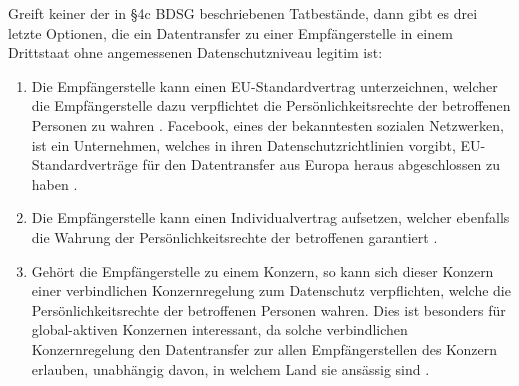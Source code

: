 \par
Greift keiner der in §4c BDSG beschriebenen Tatbestände, dann gibt es drei letzte Optionen, die ein Datentransfer zu einer Empfängerstelle in einem Drittstaat ohne angemessenen Datenschutzniveau legitim ist:
\begin{enumerate}
	\item Die Empfängerstelle kann einen EU-Standardvertrag unterzeichnen, welcher die Empfängerstelle dazu verpflichtet die Persönlichkeitsrechte der betroffenen Personen zu wahren \autocite[vgl.][]{LDI.2017}. Facebook, eines der bekanntesten sozialen Netzwerken, ist ein Unternehmen, welches in ihren Datenschutzrichtlinien vorgibt, EU-Standardverträge für den Datentransfer aus Europa heraus abgeschlossen zu haben \autocite[vgl.][]{FacebookInc..2017}.
	 
	\item Die Empfängerstelle kann einen Individualvertrag aufsetzen, welcher ebenfalls die Wahrung der Persönlichkeitsrechte der betroffenen garantiert \autocite[vgl.][]{LDI.2017}.
	
	\item Gehört die Empfängerstelle zu einem Konzern, so kann sich dieser Konzern einer verbindlichen Konzernregelung zum Datenschutz verpflichten, welche die Persönlichkeitsrechte der betroffenen Personen wahren. Dies ist besonders für global-aktiven Konzernen interessant, da solche verbindlichen Konzernregelung den Datentransfer zur allen Empfängerstellen des Konzern erlauben, unabhängig davon, in welchem Land sie ansässig sind \autocite[vgl.][]{LDI.2017}.
\end{enumerate}

